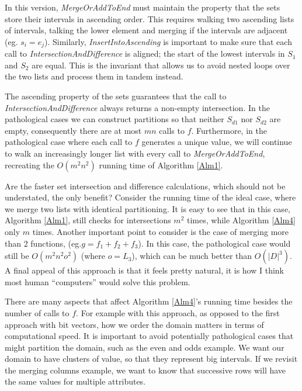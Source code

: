 \documentclass{article}
\begin{document}
In this version, \emph{MergeOrAddToEnd} must maintain the property that the
sets store their intervals in ascending order.
This requires walking two ascending lists of intervals,
talking the lower element and merging if the intervals are adjacent
(eg. $s_{i} = e_{j}$).
Similarly, \emph{InsertIntoAscending} is important to make sure that each
call to \emph{IntersectionAndDifference} is aligned;
the start of the lowest intervals in $S_{1}$ and $S_{2}$ are equal.
This is the invariant that allows us to avoid nested loops over the two lists
and process them in tandem instead.

The ascending property of the sets guarantees that the call to
\emph{IntersectionAndDifference} always returns a non-empty intersection.
In the pathological cases we can construct partitions so that
neither $S_{d1}$ nor $S_{d2}$ are empty,
consequently there are at most $mn$ calls to $f$.
Furthermore,
in the pathological case where each call to $f$ generates a unique value,
we will continue to walk an increasingly longer list with every call to
\emph{MergeOrAddToEnd},
recreating the $O(m^{2}n^{2})$ running time of Algorithm \ref{Alm1}.

Are the faster set intersection and difference calculations,
which should not be understated,
the only benefit?
Consider the running time of the ideal case,
where we merge two lists with identical partitioning.
It is easy to see that in this case,
Algorithm \ref{Alm1},
still checks for intersections $m^{2}$ times,
while Algorithm \ref{Alm4} only $m$ times.
Another important point to consider is the case of merging more than 2
functions, (eg.$g = f_{1}+f_{2}+f_{3}$).
In this case, the pathological case would still be $O(m^{2}n^{2}o^{2})$
(where $o = L_{3}$),
which can be much better than $O(|D|^{3})$.
A final appeal of this approach is that it feels pretty natural,
it is how I think most human ``computers'' would solve this problem.

There are many aspects that affect Algorithm \ref{Alm4}'s running time besides
the number of calls to $f$.
For example
with this approach,
as opposed to the first approach with bit vectors,
how we order the domain matters in terms of computational speed.
It is important to avoid potentially pathological cases that might
partition the domain, such as the even and odds example.
We want our domain to have clusters of value,
so that they represent big intervals.
If we revisit the merging columns example,
we want to know that successive rows will have the same values for
multiple attributes.
\end{document}
